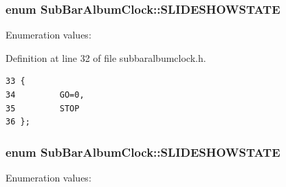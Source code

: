 \subsubsection{\setlength{\rightskip}{0pt plus 5cm}enum {\bf Sub\-Bar\-Album\-Clock::SLIDESHOWSTATE}\hspace{0.3cm}{\tt  [private]}}\label{classSubBarAlbumClock_SubBarAlbumClocky3}


\begin{Desc}
\item[Enumeration values: ]\par
\begin{description}
\item[{\em 
GO\label{classSubBarAlbumClock_SubBarAlbumClocky3SubBarAlbumClocky0}
}]\item[{\em 
STOP\label{classSubBarAlbumClock_SubBarAlbumClocky3SubBarAlbumClocky1}
}]\end{description}
\end{Desc}



Definition at line 32 of file subbaralbumclock.h.



\footnotesize\begin{verbatim}33 {
34         GO=0,
35         STOP
36 };
\end{verbatim}\normalsize 
{}
\subsubsection{\setlength{\rightskip}{0pt plus 5cm}enum {\bf Sub\-Bar\-Album\-Clock::SLIDESHOWSTATE}\hspace{0.3cm}{\tt  [private]}}\label{classSubBarAlbumClock_SubBarAlbumClocky2}


\begin{Desc}
\item[Enumeration values: ]\par
\begin{description}
\item[{\em 
GO\label{classSubBarAlbumClock_SubBarAlbumClocky3SubBarAlbumClocky0}
}]\item[{\em 
STOP\label{classSubBarAlbumClock_SubBarAlbumClocky3SubBarAlbumClocky1}
}]\end{description}
\end{Desc}



